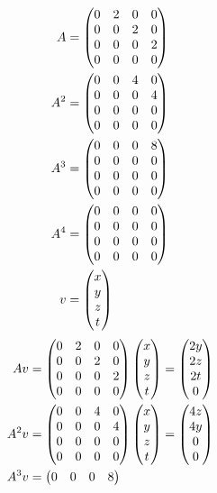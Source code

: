 \documentclass{mshw}
\begin{document}
\begin{multicols}{2}
\begin{align*}
A &= \begin{pmatrix}
  0 & 2 & 0 & 0 \\
  0 & 0 & 2 & 0 \\
  0 & 0 & 0 & 2 \\
  0 & 0 & 0 & 0
\end{pmatrix} \\
A^2 &= \begin{pmatrix}
  0 & 0 & 4 & 0 \\
  0 & 0 & 0 & 4 \\
  0 & 0 & 0 & 0 \\
  0 & 0 & 0 & 0
\end{pmatrix} \\
A^3 &= \begin{pmatrix}
  0 & 0 & 0 & 8 \\
  0 & 0 & 0 & 0 \\
  0 & 0 & 0 & 0 \\
  0 & 0 & 0 & 0
\end{pmatrix} \\
A^4 &= \begin{pmatrix}
  0 & 0 & 0 & 0 \\
  0 & 0 & 0 & 0 \\
  0 & 0 & 0 & 0 \\
  0 & 0 & 0 & 0
\end{pmatrix} \\
v &= \begin{pmatrix} x \\ y \\ z \\ t \end{pmatrix}\\
\end{align*}
\begin{align*}
A v &= \begin{pmatrix}
  0 & 2 & 0 & 0 \\
  0 & 0 & 2 & 0 \\
  0 & 0 & 0 & 2 \\
  0 & 0 & 0 & 0
\end{pmatrix}
\begin{pmatrix} x \\ y \\ z \\ t \end{pmatrix}
= \begin{pmatrix} 2 y \\ 2 z \\ 2 t \\ 0 \end{pmatrix}
\\
A^2 v &= \begin{pmatrix}
  0 & 0 & 4 & 0 \\
  0 & 0 & 0 & 4 \\
  0 & 0 & 0 & 0 \\
  0 & 0 & 0 & 0
\end{pmatrix}
\begin{pmatrix} x \\ y \\ z \\ t \end{pmatrix}
= \begin{pmatrix} 4 z \\ 4 y \\ 0 \\ 0 \end{pmatrix}
\\
A^3 v &= \begin{pmatrix}
  0 & 0 & 0 & 8 \\
\end{pmatrix}
\end{align*}
\end{multicols}
\end{document}
